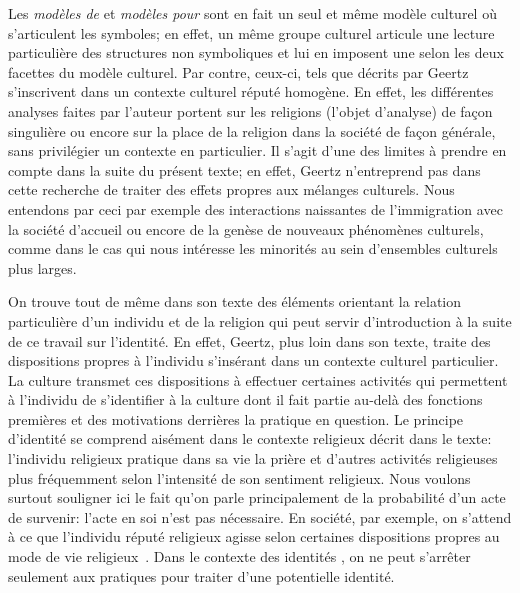 Les \emph{modèles de} et \emph{modèles pour} sont en fait un seul et même modèle culturel où s'articulent les symboles; en effet, un même groupe culturel articule une lecture particulière des structures non symboliques et lui en imposent une selon les deux facettes du modèle culturel.
Par contre, ceux-ci, tels que décrits par Geertz s'inscrivent dans un contexte culturel réputé homogène.
En effet, les différentes analyses faites par l'auteur portent sur les religions  (l'objet d'analyse) de façon singulière ou encore sur la place de la religion dans la société de façon générale, sans privilégier un contexte en particulier.
Il s'agit d'une des limites à prendre en compte dans la suite du présent texte; en effet, Geertz n'entreprend pas dans cette recherche de traiter des effets propres aux mélanges culturels.
Nous entendons par ceci par exemple des interactions naissantes de l'immigration avec la société d'accueil ou encore de la genèse de nouveaux phénomènes culturels, comme dans le cas qui nous intéresse les minorités \lgbt{} au sein d'ensembles culturels plus larges.

On trouve tout de même dans son texte des éléments orientant la relation particulière d'un individu et de la religion qui peut servir d'introduction à la suite de ce travail sur l'identité.
En effet, Geertz, plus loin dans son texte, traite des dispositions propres à l'individu s'insérant dans un contexte culturel particulier.
La culture transmet ces dispositions à effectuer certaines activités qui permettent à l'individu de s'identifier à la culture dont il fait partie au-delà des fonctions premières et des motivations derrières la pratique en question.
Le principe d'identité se comprend aisément dans le contexte religieux décrit dans le texte: l'individu religieux pratique dans sa vie la prière et d'autres activités religieuses plus fréquemment selon l'intensité de son sentiment religieux.
Nous voulons surtout souligner ici le fait qu'on parle principalement de la probabilité d'un acte de survenir: l'acte en soi n'est pas nécessaire.
En société, par exemple, on s'attend à ce que l'individu réputé religieux agisse selon certaines dispositions propres au mode de vie religieux~\citep[28--30]{Geertz1972}.
Dans le contexte des identités \lgbt{}, on ne peut s'arrêter seulement aux pratiques pour traiter d'une potentielle identité.

